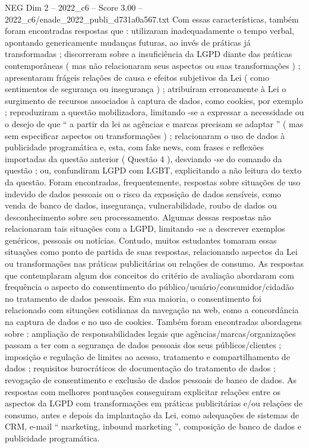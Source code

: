 \begin{textsample}{NEG Dim 2 – 2022\_c6 – Score 3.00 – 2022\_c6/enade\_2022\_publi\_d731a0a567.txt}
Com essas características, também foram encontradas respostas que : utilizaram inadequadamente o tempo verbal, apontando genericamente mudanças futuras, ao invés de práticas já transformadas ; discorreram sobre a insuficiência da LGPD diante das práticas contemporâneas ( mas não relacionaram seus aspectos ou suas transformações ) ; apresentaram frágeis relações de causa e efeitos subjetivos da Lei ( como sentimentos de segurança ou insegurança ) ; atribuíram erroneamente à Lei o surgimento de recursos associados à captura de dados, como cookies, por exemplo ; reproduziram a questão mobilizadora, limitando -se a expressar a necessidade ou o desejo de que “ a partir da lei as agências e marcas precisam se adaptar ” ( mas sem especificar aspectos ou transformações ) ; relacionaram o uso de dados à publicidade programática e, esta, com fake news, com frases e reflexões importadas da questão anterior ( Questão 4 ), desviando -se do comando da questão ; ou, confundiram LGPD com LGBT, explicitando a não leitura do texto da questão.
Foram encontradas, frequentemente, respostas sobre situações de uso indevido de dados pessoais ou o risco da exposição de dados sensíveis, como venda de banco de dados, insegurança, vulnerabilidade, roubo de dados ou desconhecimento sobre seu processamento.
Algumas dessas respostas não relacionaram tais situações com a LGPD, limitando -se a descrever exemplos genéricos, pessoais ou notícias.
Contudo, muitos estudantes tomaram essas situações como ponto de partida de suas respostas, relacionando aspectos da Lei ou transformações nas práticas publicitárias ou relações de consumo.
As respostas que contemplaram algum dos conceitos do critério de avaliação abordaram com frequência o aspecto do consentimento do público/usuário/consumidor/cidadão no tratamento de dados pessoais.
Em sua maioria, o consentimento foi relacionado com situações cotidianas da navegação na web, como a concordância na captura de dados e no uso de cookies.
Também foram encontradas abordagens sobre : ampliação de responsabilidades legais que agências/marcas/organizações passam a ter com a segurança de dados pessoais dos seus públicos/clientes ; imposição e regulação de limites ao acesso, tratamento e compartilhamento de dados ; requisitos burocráticos de documentação do tratamento de dados ; revogação de consentimento e exclusão de dados pessoais de banco de dados.
As respostas com melhores pontuações conseguiram explicitar relações entre os aspectos da LGPD com transformações em práticas publicitárias e/ou relações de consumo, antes e depois da implantação da Lei, como adequações de sistemas de CRM, e-mail “ marketing, inbound marketing ”, composição de banco de dados e publicidade programática.

\end{textsample}
